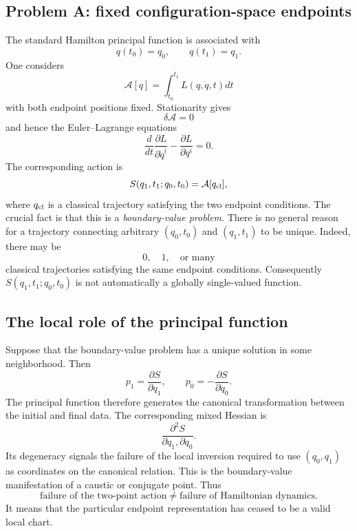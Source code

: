 \subsection{Problem A: fixed configuration-space endpoints}
The standard Hamilton principal function is associated with
\begin{equation}
q(t_0)=q_0,
\qquad
q(t_1)=q_1.
\end{equation}
One considers
\begin{equation}
\mathcal A[q]=\int_{t_0}^{t_1}L(q,\dot q,t)dt
\end{equation}
with both endpoint positions fixed.
Stationarity gives
\begin{equation}
\delta\mathcal A=0
\end{equation}
and hence the Euler--Lagrange equations
\begin{equation}
\frac{d}{dt}
\frac{\partial L}{\partial\dot q^i}-
\frac{\partial L}{\partial q^i}=0.
\end{equation}
The corresponding action is
\begin{equation}
S(q_1,t_1;q_0,t_0)=\mathcal A[q_{\rm cl}],
\end{equation}
where \(q_{\rm cl}\) is a classical trajectory satisfying the two endpoint
conditions.
The crucial fact is that this is a \emph{boundary-value problem}.
There is no general reason for a trajectory connecting arbitrary
\((q_0,t_0)\) and \((q_1,t_1)\) to be unique.
Indeed, there may be
\begin{equation}
0,\quad1,\quad\text{or many}
\end{equation}
classical trajectories satisfying the same endpoint conditions.
Consequently \(S(q_1,t_1;q_0,t_0)\) is not automatically a globally
single-valued function.
\subsection{The local role of the principal function}
Suppose that the boundary-value problem has a unique solution in some
neighborhood.  Then
\begin{equation}
p_1=\frac{\partial S}{\partial q_1},
\qquad
p_0=-\frac{\partial S}{\partial q_0}.
\end{equation}
The principal function therefore generates the canonical transformation
between the initial and final data.
The corresponding mixed Hessian is
\begin{equation}
\frac{\partial^2 S}
{\partial q_1,\partial q_0}.
\end{equation}
Its degeneracy signals the failure of the local inversion required to use
\((q_0,q_1)\) as coordinates on the canonical relation.
This is the boundary-value manifestation of a caustic or conjugate point.
Thus
\begin{equation}
\boxed{
\text{failure of the two-point action}
\neq
\text{failure of Hamiltonian dynamics}.
}
\end{equation}
It means that the particular endpoint representation has ceased to be a
valid local chart.
